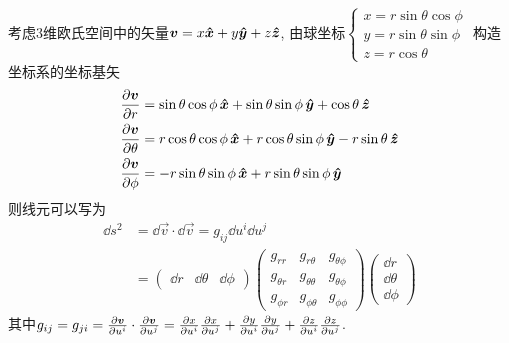 \begin{solution}
    考虑$3$维欧氏空间中的矢量$\boldsymbol{v} = x \boldsymbol{\hat{x}} + y \boldsymbol{\hat{y}} + z \boldsymbol{\hat{z}}$, 由球坐标$\begin{cases}
            x = r \sin\theta \cos\phi \\
            y = r \sin\theta \sin\phi \\
            z = r \cos\theta
        \end{cases}$
    构造坐标系的坐标基矢
    \[
        \begin{aligned}
            \frac{\partial \boldsymbol{v}}{\partial r} &= \sin\theta \cos\phi \,\boldsymbol{\hat{x}} + \sin\theta \sin\phi \,\boldsymbol{\hat{y}} + \cos\theta \,\boldsymbol{\hat{z}} \\
            \frac{\partial \boldsymbol{v}}{\partial \theta} &= r \cos\theta \cos\phi \,\boldsymbol{\hat{x}} + r \cos\theta \sin\phi \,\boldsymbol{\hat{y}} - r \sin\theta \,\boldsymbol{\hat{z}} \\
            \frac{\partial \boldsymbol{v}}{\partial \phi} &= -r \sin\theta \sin\phi \,\boldsymbol{\hat{x}} + r \sin\theta \sin\phi \,\boldsymbol{\hat{y}}
        \end{aligned}
    \]
    则线元可以写为
    \begin{align*}
        \dd s^2 &= \dd \vec{v} \cdot \dd \vec{v} = g_{ij} \dd u^i \dd u^j\\
        &= \begin{pmatrix}
            \dd r & \dd \theta & \dd \phi
        \end{pmatrix} \begin{pmatrix}
            g_{rr} & g_{r\theta} & g_{\theta\phi} \\
            g_{\theta r} & g_{\theta\theta} & g_{\theta\phi} \\
            g_{\phi r} & g_{\phi\theta} & g_{\phi\phi}
        \end{pmatrix} \begin{pmatrix}
            \dd r \\ \dd \theta \\ \dd \phi
        \end{pmatrix}
    \end{align*}
    其中$g_{ij} = g_{ji} = \frac{\partial \boldsymbol{v}}{\partial u^i} \cdot \frac{\partial \boldsymbol{v}}{\partial u^j} =
    \frac{\partial x}{\partial u^i} \frac{\partial x}{\partial u^j} + \frac{\partial y}{\partial u^i}
    \frac{\partial y}{\partial u^j} + \frac{\partial z}{\partial u^i} \frac{\partial z}{\partial u^j}$.
    

\end{solution}
